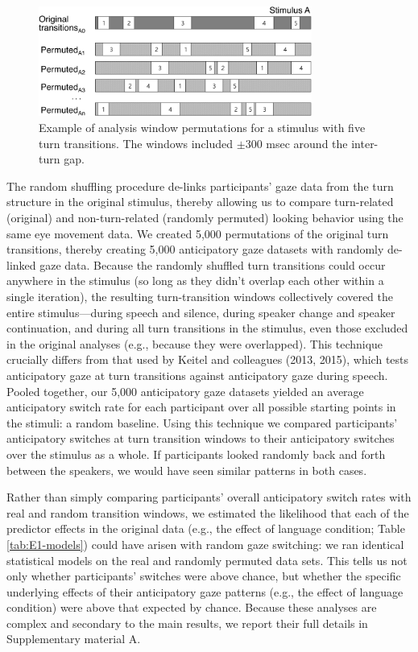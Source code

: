 \documentclass[authoryear, 12pt]{elsarticle}
\begin{document}
\begin{figure}[t!]
\begin{center}
\includegraphics[width=0.8\textwidth]{figures/FIG-ShuffledWindows.png}
\end{center}
\caption{Example of analysis window permutations for a stimulus with five turn transitions. The windows included $\pm$300 msec around the inter-turn gap.}
\label{fig:shuffling}
\end{figure}

The random shuffling procedure de-links participants' gaze data from the turn structure in the original stimulus, thereby allowing us to compare turn-related (original) and non-turn-related (randomly permuted) looking behavior using the same eye movement data. We created 5,000 permutations of the original turn transitions, thereby creating 5,000 anticipatory gaze datasets with randomly de-linked gaze data. Because the randomly shuffled turn transitions could occur anywhere in the stimulus (so long as they didn't overlap each other within a single iteration), the resulting turn-transition windows collectively covered the entire stimulus---during speech and silence, during speaker change and speaker continuation, and during all turn transitions in the stimulus, even those excluded in the original analyses (e.g., because they were overlapped). This technique crucially differs from that used by Keitel and colleagues (2013, 2015), which tests anticipatory gaze at turn transitions against anticipatory gaze during speech. Pooled together, our 5,000 anticipatory gaze datasets yielded an average anticipatory switch rate for each participant over all possible starting points in the stimuli: a random baseline. Using this technique we compared participants' anticipatory switches at turn transition windows to their anticipatory switches over the stimulus as a whole. If participants looked randomly back and forth between the speakers, we would have seen similar patterns in both cases.

Rather than simply comparing participants' overall anticipatory switch rates with real and random transition windows, we estimated the likelihood that each of the predictor effects in the original data (e.g., the effect of language condition; Table \ref{tab:E1-models}) could have arisen with random gaze switching: we ran identical statistical models on the real and randomly permuted data sets. This tells us not only whether participants' switches were above chance, but whether the specific underlying effects of their anticipatory gaze patterns (e.g., the effect of language condition) were above that expected by chance. Because these analyses are complex and secondary to the main results, we report their full details in Supplementary material A.
\end{document}
